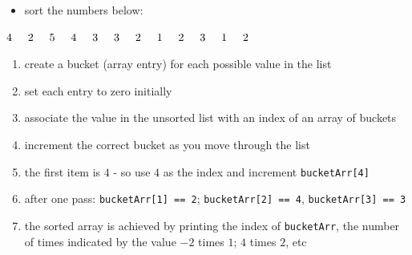 \begin{mybox}[Periwinkle]{}
    \begin{itemize}
        \item[] sort the numbers below:
    \end{itemize}

    \begin{center}
        $4 \hspace{0.5cm} 2 \hspace{0.5cm} 5 \hspace{0.5cm} 4 \hspace{0.5cm} 3 \hspace{0.5cm} 3 \hspace{0.5cm} 2 \hspace{0.5cm} 1 \hspace{0.5cm}2 \hspace{0.5cm} 3 \hspace{0.5cm} 1 \hspace{0.5cm} 2$
    \end{center}

    \begin{enumerate}
        \item create a bucket (array entry) for each possible value in the list
        \item set each entry to zero initially
        \item associate the value in the unsorted list with an index of an array of buckets 
        \item increment the correct bucket as you move through the list
        \item the first item is $4$ - so use $4$ as the index and increment \texttt{{bucketArr[4]}}
        \item after one pass: \texttt{bucketArr[1] == 2}; \texttt{bucketArr[2] == 4}, \texttt{bucketArr[3] == 3}
        \item the sorted array is achieved by printing the index of \texttt{bucketArr}, the number of times indicated by the value $-2$ times $1$; $4$ times $2$, etc 
    \end{enumerate}
\end{mybox}


